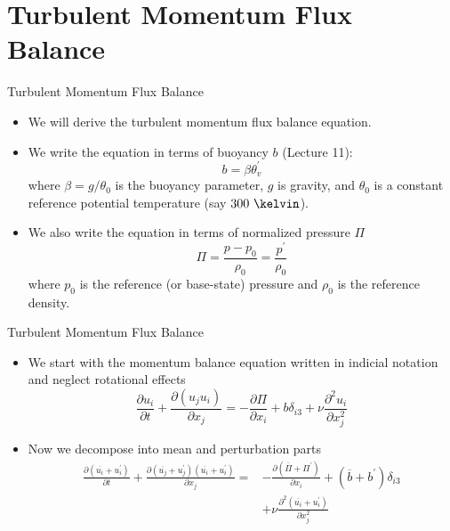 \section{Turbulent Momentum Flux Balance}       %
\begin{frame}{Turbulent Momentum Flux Balance}
\begin{itemize}
  	\item We will derive the turbulent momentum flux balance equation.
  	\item We write the equation in terms of buoyancy $b$ (Lecture 11):
  	$$b = \beta \theta_v^\prime$$
  	where $\beta = g/\theta_{0}$ is the buoyancy parameter, $g$ is gravity, and $\theta_{0}$ is a constant reference potential temperature (say $300\ \kelvin$).
  	\item We also write the equation in terms of normalized pressure $\Pi$
  	$$\Pi = \frac{p-p_0}{\rho_0} = \frac{p^\prime}{\rho_0}$$
  	where $p_0$ is the reference (or base-state) pressure and $\rho_0$ is the reference density.
  \end{itemize}
\end{frame}
\begin{frame}{Turbulent Momentum Flux Balance}
\begin{itemize}
  	\item We start with the momentum balance equation written in indicial notation and neglect rotational effects
  	\begin{equation}
  	\label{eq1}
  	\frac{\partial u_i}{\partial t} + \frac{\partial (u_j u_i)}{\partial x_j} = -\frac{\partial \Pi}{\partial x_i} + b\delta_{i3} + \nu \frac{\partial^2 u_i}{\partial x_j^2}
  	\end{equation}
  	\item Now we decompose into mean and perturbation parts
  	\begin{align*}
  	\frac{\partial (\overline{u_i} + u_i^\prime)}{\partial t} + \frac{\partial (\overline{u_j} + u_j^\prime)(\overline{u_i} + u_i^\prime)}{\partial x_j} = &-\frac{\partial (\overline{\Pi} + \Pi^\prime)}{\partial x_i} + (\overline{b} + b^\prime)\delta_{i3} \\&+ \nu \frac{\partial^2 (\overline{u_i} + u_i^\prime)}{\partial x_j^2}
  	\end{align*}
  \end{itemize}
\end{frame}
